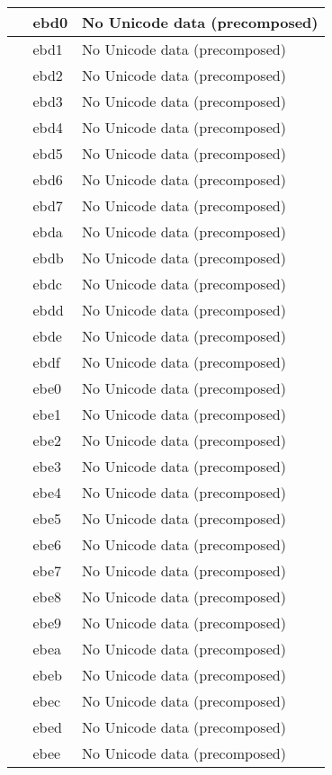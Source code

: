 \documentclass[12pt,letterpaper,openany]{book}
\begin{document}
\begin{center}
\begin{supertabular}{|m{0.25in}|m{0.5in}|m{4in}|}
			 & ebd0 & No Unicode data (precomposed)\\\hline
			 & ebd1 & No Unicode data (precomposed)\\\hline
			 & ebd2 & No Unicode data (precomposed)\\\hline
			 & ebd3 & No Unicode data (precomposed)\\\hline
			 & ebd4 & No Unicode data (precomposed)\\\hline
			 & ebd5 & No Unicode data (precomposed)\\\hline
			 & ebd6 & No Unicode data (precomposed)\\\hline
			 & ebd7 & No Unicode data (precomposed)\\\hline
			 & ebda & No Unicode data (precomposed)\\\hline
			 & ebdb & No Unicode data (precomposed)\\\hline
			 & ebdc & No Unicode data (precomposed)\\\hline
			 & ebdd & No Unicode data (precomposed)\\\hline
			 & ebde & No Unicode data (precomposed)\\\hline
			 & ebdf & No Unicode data (precomposed)\\\hline
			 & ebe0 & No Unicode data (precomposed)\\\hline
			 & ebe1 & No Unicode data (precomposed)\\\hline
			 & ebe2 & No Unicode data (precomposed)\\\hline
			 & ebe3 & No Unicode data (precomposed)\\\hline
			 & ebe4 & No Unicode data (precomposed)\\\hline
			 & ebe5 & No Unicode data (precomposed)\\\hline
			 & ebe6 & No Unicode data (precomposed)\\\hline
			 & ebe7 & No Unicode data (precomposed)\\\hline
			 & ebe8 & No Unicode data (precomposed)\\\hline
			 & ebe9 & No Unicode data (precomposed)\\\hline
			 & ebea & No Unicode data (precomposed)\\\hline
			 & ebeb & No Unicode data (precomposed)\\\hline
			 & ebec & No Unicode data (precomposed)\\\hline
			 & ebed & No Unicode data (precomposed)\\\hline
			 & ebee & No Unicode data (precomposed)\\\hline

\end{supertabular}
\end{center}
\end{document}

